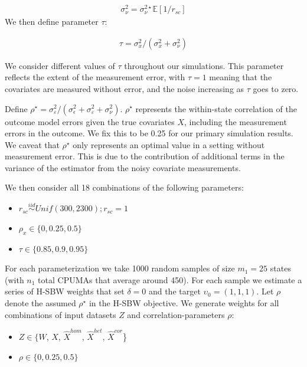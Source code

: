 \begin{align*}
    \sigma_{\nu}^2 =
     \sigma_\nu^{2\star}\mathbb{E}[1/r_{sc}]
\end{align*}
%
We then define parameter $\tau$:

\begin{align*}
    \tau = \sigma^2_x/(\sigma^2_x + \sigma^2_{\nu})
\end{align*}

We consider different values of $\tau$ throughout our simulations. This parameter reflects the extent of the measurement error, with $\tau = 1$ meaning that the covariates are measured without error, and the noise increasing as $\tau$ goes to zero.

Define $\rho^\star = \sigma^2_{\varepsilon}/(\sigma^2_{\epsilon} + \sigma^2_{\varepsilon} + \sigma^2_{\nu})$. $\rho^\star$ represents the within-state correlation of the outcome model errors given the true covariates $X$, including the measurement errors in the outcome. We fix this to be 0.25 for our primary simulation results. We caveat that $\rho^\star$ only represents an optimal value in a setting without measurement error. This is due to the contribution of additional terms in the variance of the estimator from the noisy covariate measurements.  

We then consider all 18 combinations of the following parameters:

\begin{itemize}
    \item $r_{sc} \stackrel{iid}\sim Unif(300, 2300); r_{sc} = 1$ 
    \item $\rho_x \in \{0, 0.25, 0.5\}$
    \item $\tau \in \{0.85, 0.9, 0.95\}$
\end{itemize}

For each parameterization we take 1000 random samples of size $m_1 = 25$ states (with $n_1$ total CPUMAs that average around 450). For each sample we estimate a series of H-SBW weights that set $\delta = 0$ and the target $\upsilon_0 = (1, 1, 1)$. Let $\rho$ denote the assumed $\rho^\star$ in the H-SBW objective. We generate weights for all combinations of input datasets $Z$ and correlation-parameters $\rho$:

\begin{itemize}
    \item $Z \in \{W$, $X$, $\hat{X}^{hom}$, $\hat{X}^{het}$, $\hat{X}^{cor}$\}
    \item $\rho \in \{0, 0.25, 0.5\}$
\end{itemize}

